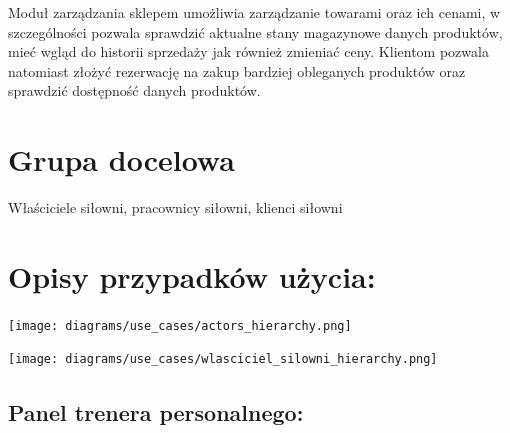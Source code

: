 \documentclass[
]{article}
\begin{document}
{}

{Moduł zarządzania sklepem umożliwia zarządzanie towarami oraz ich
cenami, w szczególności pozwala sprawdzić aktualne stany magazynowe
danych produktów, mieć wgląd do historii sprzedaży jak również zmieniać
ceny. Klientom pozwala natomiast złożyć rezerwację na zakup bardziej
obleganych produktów oraz sprawdzić dostępność danych produktów.}

{}

\hypertarget{h.no1j4fdk62eq}{%
\section{\texorpdfstring{{Grupa
docelowa}}{Grupa docelowa}}\label{h.no1j4fdk62eq}}

{Właściciele siłowni, pracownicy siłowni, klienci siłowni}

{}

\hypertarget{h.oj1ynmpx01z3}{%
\section{\texorpdfstring{{O}{pisy przypadków
użycia:}}{Opisy przypadków użycia:}}\label{h.oj1ynmpx01z3}}

{\texttt{[image: diagrams/use\_cases/actors\_hierarchy.png]}}

{\texttt{[image: diagrams/use\_cases/wlasciciel\_silowni\_hierarchy.png]}}

\hypertarget{h.9umzk2qmsz4g}{%
\subsection{\texorpdfstring{{Panel trenera
personalnego:}}{Panel trenera personalnego:}}\label{h.9umzk2qmsz4g}}
\end{document}
